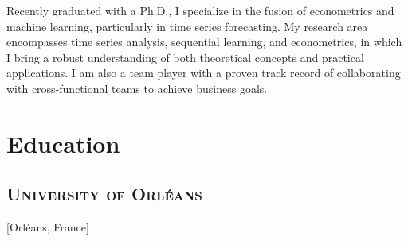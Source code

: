 \documentclass{mycv}
\begin{document}
\maketitle




\begin{summary}
  Recently graduated with a Ph.D., I specialize in the fusion of econometrics and machine learning, particularly in time series forecasting. My research area encompasses time series analysis, sequential learning, and econometrics, in which I bring a robust understanding of both theoretical concepts and practical applications. I am also a team player with a proven track record of collaborating with cross-functional teams to achieve business goals.
\end{summary}

\vspace{-1em}

\section{Education}

\subsection{\large \scshape University of Orl\'eans}[Orl\'eans, France]

\begin{positions}
\end{positions}
\end{document}
